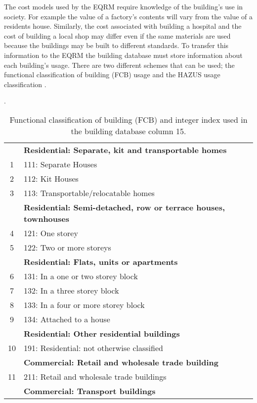 The cost models used by the EQRM require knowledge of the
building's use in society. For example the value of a factory's
contents will vary from the value of a residents house. Similarly,
the cost associated with building a hospital and the cost of
building a local shop may differ even if the same materials are
used because the buildings may be built to different standards. To
transfer this information to the EQRM the building
database must store information about
each building's usage. There are two different schemes that can be
used; the functional classification of building (FCB)
usage \citep{dr_ABS01a} and the HAZUS
usage classification
\citep{dr_FEMA99b}.


\begin{table}
\centering \caption{Functional classification of building
(FCB) \citep{dr_ABS01a} and integer
index used in the building database
column 15.} \vspace{0.8em} \label{tab:grids-FCB}  {\footnotesize .
\begin{tabular}{|c|p{}|}
 \hline
& \textbf{Residential: Separate, kit and transportable homes} \\
1 & 111: Separate Houses\\
2 & 112: Kit Houses\\
3 & 113: Transportable/relocatable homes\\
& \textbf{Residential: Semi-detached, row or terrace houses, townhouses}  \\
4 & 121: One storey\\
5 & 122: Two or more storeys\\
& \textbf{Residential: Flats, units or apartments} \\
6 & 131:  In a one or two storey block\\
7 & 132: In a three storey block\\
8 & 133:  In a four or more storey block\\
9 & 134:  Attached to a house\\
& \textbf{Residential: Other residential buildings} \\
10 & 191:  Residential: not otherwise classified \\
\hline
& \textbf{Commercial: Retail and wholesale trade building} \\
11 & 211:  Retail and wholesale trade buildings \\
& \textbf{Commercial: Transport buildings} \\

\end{tabular}}
\end{table}
